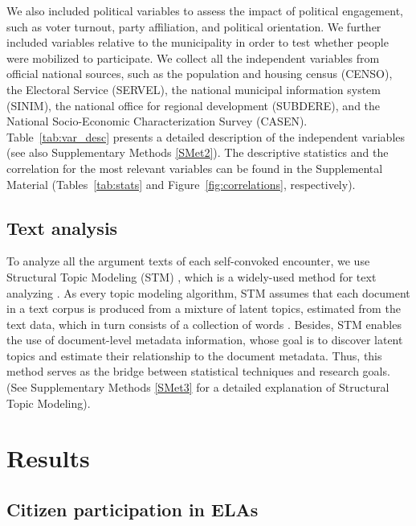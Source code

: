 \documentclass[onecolumn]{article}
\begin{document}
We also included political variables to assess the impact of political engagement, such as voter turnout, party affiliation, and political orientation. We further included variables relative to the municipality in order to test whether people were mobilized to participate. We collect all the independent variables from official national sources, such as the population and housing census (CENSO), the Electoral Service (SERVEL), the national municipal information system (SINIM), the national office for regional development (SUBDERE), and the National Socio-Economic Characterization Survey (CASEN). Table~\ref{tab:var_desc} presents a detailed description of the independent variables (see also Supplementary Methods \ref{SMet2}). The descriptive statistics and the correlation for the most relevant variables can be found in the Supplemental Material (Tables~\ref{tab:stats} and Figure~\ref{fig:correlations}, respectively). 





\subsection*{Text analysis}

To analyze all the argument texts of each self-convoked encounter, we use Structural Topic Modeling (STM) \cite{roberts2014stm}, which is a widely-used method for text analyzing \cite{roberts2014, bohr2018, lindstedt2019, almquist2019, herrera2019understanding}. As every topic modeling algorithm, STM assumes that each document in a text corpus is produced from a mixture of latent topics, estimated from the text data, which in turn consists of a collection of words \cite{Blei2012}. Besides, STM enables the use of document-level metadata information, whose goal is to discover latent topics and estimate their relationship to the document metadata. Thus, this method serves as the bridge between statistical techniques and research goals. (See Supplementary Methods \ref{SMet3} for a detailed explanation of Structural Topic Modeling).

\section*{Results}
\label{sec:results}

\subsection*{Citizen participation in ELAs}
\end{document}
